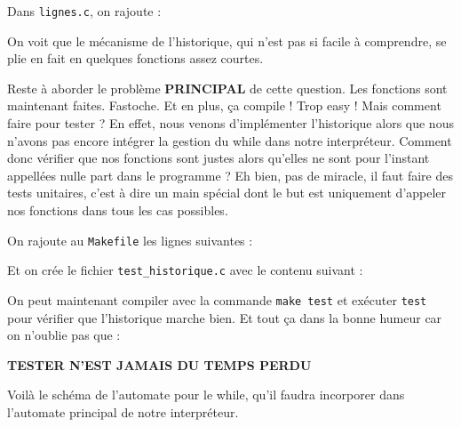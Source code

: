 \documentclass[10pt]{article}
\begin{document}
\begin{enumerate}[label=\textbf{[\alph*]}]
  

  \vspace{0.2cm}
  Dans \texttt{lignes.c}, on rajoute :

  

  On voit que le mécanisme de l'historique, qui n'est pas si facile à
  comprendre, se plie en fait en quelques fonctions assez courtes.

  \vspace{0.2cm}
  Reste à aborder le problème \textbf{PRINCIPAL} de cette
  question. Les fonctions sont maintenant faites. Fastoche. Et en
  plus, ça compile ! Trop easy ! Mais comment faire pour tester ? En
  effet, nous venons d'implémenter l'historique alors que nous n'avons
  pas encore intégrer la gestion du while dans notre
  interpréteur. Comment donc vérifier que nos fonctions sont justes
  alors qu'elles ne sont pour l'instant appellées nulle part dans le
  programme ? Eh bien, pas de miracle, il faut faire des tests
  unitaires, c'est à dire un main spécial dont le but est uniquement
  d'appeler nos fonctions dans tous les cas possibles.

  \vspace{0.2cm}
  On rajoute au \texttt{Makefile} les lignes suivantes :

  

  \vspace{0.2cm}
  Et on crée le fichier \texttt{test\_historique.c} avec le contenu
  suivant :

  

  On peut maintenant compiler avec la commande \texttt{make test} et
  exécuter \texttt{test} pour vérifier que l'historique marche
  bien. Et tout ça dans la bonne humeur car on n'oublie pas que :

  \begin{center}
    {\large {\bf TESTER N'EST JAMAIS DU TEMPS PERDU}}
  \end{center}
  \newpage

\item Voilà le schéma de l'automate pour le while, qu'il faudra
  incorporer dans l'automate principal de notre interpréteur.


\begin{center}
\end{center}
\end{enumerate}
\end{document}
